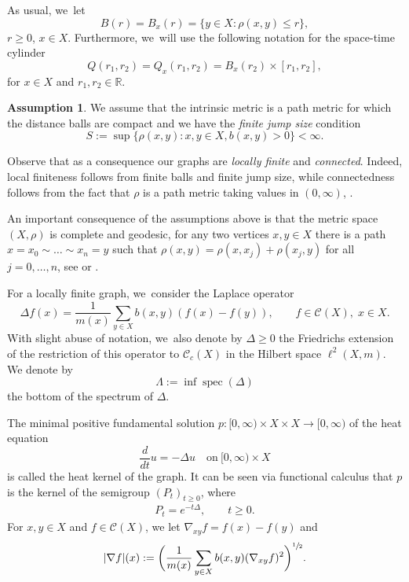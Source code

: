\documentclass[JEP,XML,SOM,Unicode,published]{cedram}
\theoremstyle{plain}
\theoremstyle{definition}
\newtheorem{assumption}[theorem]{Assumption}
\newcommand{\RR}{\mathbb{R}}
\newcommand{\cC}{\mathcal{C}}
\DeclareMathOperator{\spec}{spec}
\begin{document}
As usual, we~let
\[
B(r)= B_x(r)=\{y\in X: \rho(x,y)\leq r\},
\]
$r\geq 0 $, $x\in X$. Furthermore, we~will use the following notation for the space-time cylinder
\[
{Q(r_1,r_2)}=Q_x(r_1,r_2)=B_x(r_2)\times [r_1,r_2],
\]
for $ x\in X $ and $ r_1,r_2\in\RR$.

\begin{assumption}\label{assumption2} We assume that the intrinsic metric is a path metric for which the distance balls are compact and we have the \emph{finite jump size} condition
\[
S:=\sup\{\rho(x,y)\colon x,y\in X, b(x,y)>0\}<\infty.
\]
\end{assumption}

Observe that as a consequence our graphs are \emph{locally finite} and \emph{connected}. Indeed, local finiteness follows from finite balls and finite jump size, while connectedness follows from the fact that $ \rho $ is a path metric taking values in $ (0,\infty) $, \cf \cite{KellerLW-21}.

An important consequence of the assumptions above is that the metric space $ (X,\rho) $ is complete and geodesic, \ie for any two vertices $ x,y\in X $ there is a path $x= x_{0}\sim\ldots \sim x_{n}=y $ such that $ \rho(x,y)=\rho(x,x_{j})+\rho(x_{j},y) $ for all $ j=0,\ldots,n $, see \cite[Ch.\,11.2]{KellerLW-21} or \cite{KellerMuench}.

{For a locally finite graph, we~consider the {Laplace} operator
\[
\Delta f(x)= \frac{1}{m(x)}\sum_{y\in X}b(x,y)(f(x)-f(y)),\qquad f\in \mathcal{C}(X),\;x\in X.
\]
With slight abuse of notation, we~{also} denote by $ \Delta\geq0 $ the Friedrichs extension of the restriction of this operator to $ \mathcal{C}_{c}(X) $} in the Hilbert space $\ell^2(X,m)$. We denote by
\[
\Lambda:=\inf\spec(\Delta)
\]
the bottom of the spectrum of $\Delta$.

The minimal positive fundamental solution $p\colon [0,\infty)\times X\times X\to [0,\infty)$ of the heat equation
\[
\frac{d}{dt}u=-\Delta u \quad \text{on}\ [0,\infty)\times X
\]
is called the heat kernel of the graph. It can be seen via functional calculus that $ p $ is the kernel of the semigroup $(P_t)_{t\geq0}$, where
\begin{align*}
P_{t}=e^{-t\Delta},\qquad t\ge0.
\end{align*}
For $ x,y\in X $ and $ f\in\cC(X) $, {we let $ \nabla_{xy}f=f(x)-f(y) $ and}
\[
\vert \nabla f\vert(x):=\biggl(\frac{1}{m(x)}\sum_{y\in X}b(x,y) (\nabla_{xy}f)^2\biggr)^{\sfrac12}.
\]
\end{document}
